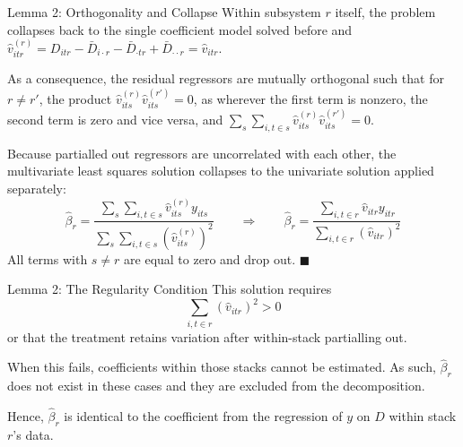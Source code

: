 \documentclass[11pt]{beamer}
\begin{document}
\begin{frame}{Lemma 2: Orthogonality and Collapse}
    Within subsystem $r$ itself, the problem collapses back to the single
    coefficient model solved before and
    $\hat{v}^{(r)}_{itr} = D_{itr} - \bar{D}_{i \cdot r} - \bar{D}_{\cdot tr} + \bar{D}_{\cdot \cdot r} = \hat{v}_{itr}$.

    \vspace{2mm}

    As a consequence, the residual regressors are mutually orthogonal such that
    for $r \neq r'$, the product $\hat{v}^{(r)}_{its} \hat{v}^{(r')}_{its} = 0$,
    as wherever the first term is nonzero, the second term is zero and vice
    versa, and $\sum_s \sum_{i,t \in s} \hat{v}^{(r)}_{its} \hat{v}^{(r')}_{its} = 0$.

    \vspace{2mm}

    Because partialled out regressors are uncorrelated with each other, the
    multivariate least squares solution collapses to the univariate solution
    applied separately:
    \[
        \hat{\beta}_r =
        \frac{\sum_s \sum_{i,t \in s} \hat{v}^{(r)}_{its} y_{its}}
             {\sum_s \sum_{i,t \in s} (\hat{v}^{(r)}_{its})^2}
        \qquad \Longrightarrow \qquad
        \hat{\beta}_r =
        \frac{\sum_{i,t \in r} \hat{v}_{itr} y_{itr}}
             {\sum_{i,t \in r} (\hat{v}_{itr})^2}
    \]
    All terms with $s \neq r$ are equal to zero and drop out. \hfill $\blacksquare$
\end{frame}

\begin{frame}{Lemma 2: The Regularity Condition}
    This solution requires
    \[
        \sum_{i,t \in r} (\hat{v}_{itr})^2 > 0
    \]
    or that the treatment retains variation after within-stack partialling out.

    \vspace{3mm}

    When this fails, coefficients within those stacks cannot be estimated. As
    such, $\hat{\beta}_r$ does not exist in these cases and they are excluded
    from the decomposition.

    \vspace{3mm}

    Hence, $\hat{\beta}_r$ is identical to the coefficient from the regression of
    $y$ on $D$ within stack $r$'s data.
\end{frame}
\end{document}
